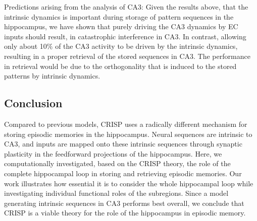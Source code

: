 \documentclass[utf8]{frontiersSCNS} %
\begin{document}
Predictions arising from the analysis of CA3: Given the results above, that the intrinsic dynamics is important during storage of pattern sequences in the hippocampus, we have shown that purely driving the CA3 dynamics by EC inputs should result, in catastrophic interference in CA3. In contrast, allowing only about 10$\%$ of the CA3 activity to be driven by the intrinsic dynamics, resulting in a proper retrieval of the stored sequences in CA3. The performance in retrieval would be due to the orthogonality that is induced to the stored patterns by intrinsic dynamics. 

\subsection{Conclusion} 
Compared to previous models, CRISP uses a radically different mechanism for storing episodic memories in the hippocampus. Neural sequences are intrinsic to CA3, and inputs are mapped onto these intrinsic sequences through synaptic plasticity in the feedforward projections of the hippocampus. Here, we computationally investigated, based on the CRISP theory, the role of the complete hippocampal loop in storing and retrieving episodic memories. Our work illustrates how essential it is to consider the whole hippocampal loop while investigating individual functional roles of the subregions. Since a model generating intrinsic sequences in CA3 performs best overall, we conclude that CRISP is a viable theory for the role of the hippocampus in episodic memory.




\end{document}
